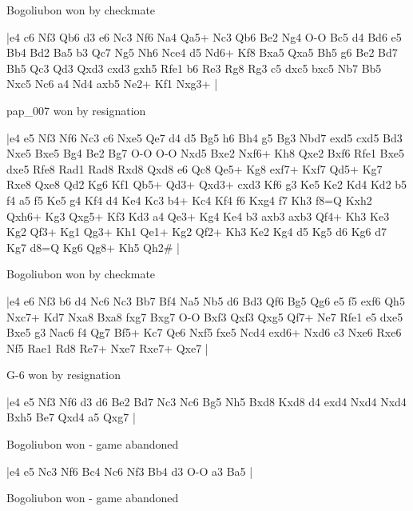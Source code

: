 \showboard

Bogoliubon won by checkmate

\makegametitle
|e4 c6 Nf3 Qb6 d3 e6 Nc3 Nf6 Na4 Qa5+ Nc3 Qb6 Be2 Ng4 O-O Bc5 d4 Bd6 e5 Bb4 Bd2 Ba5 b3 Qc7 Ng5 Nh6 Nce4 d5 Nd6+ Kf8 Bxa5 Qxa5 Bh5 g6 Be2 Bd7 Bh5 Qc3 Qd3 Qxd3 cxd3 gxh5 Rfe1 b6 Re3 Rg8 Rg3 c5 dxc5 bxc5 Nb7 Bb5 Nxc5 Nc6 a4 Nd4 axb5 Ne2+ Kf1 Nxg3+  |

\showboard

pap\_007 won by resignation

\makegametitle
|e4 e5 Nf3 Nf6 Nc3 c6 Nxe5 Qe7 d4 d5 Bg5 h6 Bh4 g5 Bg3 Nbd7 exd5 cxd5 Bd3 Nxe5 Bxe5 Bg4 Be2 Bg7 O-O O-O Nxd5 Bxe2 Nxf6+ Kh8 Qxe2 Bxf6 Rfe1 Bxe5 dxe5 Rfe8 Rad1 Rad8 Rxd8 Qxd8 e6 Qc8 Qe5+ Kg8 exf7+ Kxf7 Qd5+ Kg7 Rxe8 Qxe8 Qd2 Kg6 Kf1 Qb5+ Qd3+ Qxd3+ cxd3 Kf6 g3 Ke5 Ke2 Kd4 Kd2 b5 f4 a5 f5 Ke5 g4 Kf4 d4 Ke4 Kc3 b4+ Kc4 Kf4 f6 Kxg4 f7 Kh3 f8=Q Kxh2 Qxh6+ Kg3 Qxg5+ Kf3 Kd3 a4 Qe3+ Kg4 Ke4 b3 axb3 axb3 Qf4+ Kh3 Ke3 Kg2 Qf3+ Kg1 Qg3+ Kh1 Qe1+ Kg2 Qf2+ Kh3 Ke2 Kg4 d5 Kg5 d6 Kg6 d7 Kg7 d8=Q Kg6 Qg8+ Kh5 Qh2\#  |

\showboard

Bogoliubon won by checkmate

\makegametitle
|e4 e6 Nf3 b6 d4 Nc6 Nc3 Bb7 Bf4 Na5 Nb5 d6 Bd3 Qf6 Bg5 Qg6 e5 f5 exf6 Qh5 Nxc7+ Kd7 Nxa8 Bxa8 fxg7 Bxg7 O-O Bxf3 Qxf3 Qxg5 Qf7+ Ne7 Rfe1 e5 dxe5 Bxe5 g3 Nac6 f4 Qg7 Bf5+ Kc7 Qe6 Nxf5 fxe5 Ncd4 exd6+ Nxd6 c3 Nxe6 Rxe6 Nf5 Rae1 Rd8 Re7+ Nxe7 Rxe7+ Qxe7  |

\showboard

G-6 won by resignation

\makegametitle
|e4 e5 Nf3 Nf6 d3 d6 Be2 Bd7 Nc3 Nc6 Bg5 Nh5 Bxd8 Kxd8 d4 exd4 Nxd4 Nxd4 Bxh5 Be7 Qxd4 a5 Qxg7  |

\showboard

Bogoliubon won - game abandoned

\makegametitle
|e4 e5 Nc3 Nf6 Bc4 Nc6 Nf3 Bb4 d3 O-O a3 Ba5  |

\showboard

Bogoliubon won - game abandoned

